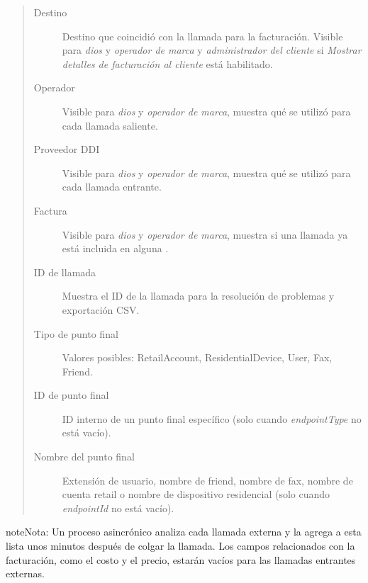 \documentclass[letterpaper,10pt,spanish]{sphinxmanual}
\begin{document}
\begin{quote}
\begin{description}
\item[{Destino}] \leavevmode
Destino que coincidió con la llamada para la facturación. Visible para \emph{dios} y \emph{operador de marca} y \emph{administrador del cliente} si \emph{Mostrar detalles de facturación al cliente} está habilitado.

\item[{Operador}] \leavevmode
Visible para \emph{dios} y \emph{operador de marca}, muestra qué {\hyperref[administration_portal/brand/providers/carriers:carriers]{}} se utilizó para cada llamada saliente.

\item[{Proveedor DDI}] \leavevmode
Visible para \emph{dios} y \emph{operador de marca}, muestra qué {\hyperref[administration_portal/brand/providers/ddi_providers:ddi\string-providers]{}} se utilizó para cada llamada entrante.

\item[{Factura}] \leavevmode
Visible para \emph{dios} y \emph{operador de marca}, muestra si una llamada ya está incluida en alguna {\hyperref[administration_portal/brand/invoicing/invoices:invoices]{}}.

\item[{ID de llamada}] \leavevmode
Muestra el ID de la llamada para la resolución de problemas y exportación CSV.

\item[{Tipo de punto final}] \leavevmode
Valores posibles: RetailAccount, ResidentialDevice, User, Fax, Friend.

\item[{ID de punto final}] \leavevmode
ID interno de un punto final específico (solo cuando \emph{endpointType} no está vacío).

\item[{Nombre del punto final}] \leavevmode
Extensión de usuario, nombre de friend, nombre de fax, nombre de cuenta retail o nombre de dispositivo residencial (solo cuando \emph{endpointId} no está vacío).

\end{description}
\end{quote}

\begin{notice}{note}{Nota:}
Un proceso asincrónico analiza cada llamada externa y la agrega a esta lista unos minutos después de colgar la llamada. Los campos relacionados con la facturación, como el costo y el precio, estarán vacíos para las llamadas entrantes externas.
\end{notice}
\end{document}
